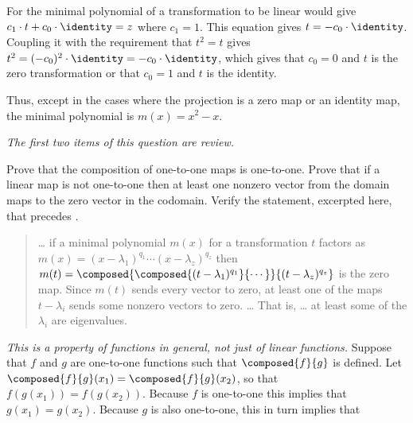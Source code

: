 \begin{exercises}
\begin{answer}
      For the minimal polynomial of a transformation to be linear would give 
      $c_1\cdot t+c_0\cdot\identity=z$ where $c_1=1$.
      This equation gives $t=-c_0\cdot \identity$.
      Coupling it with the requirement that $t^2=t$ gives
      $t^2=(-c_0)^2\cdot\identity=-c_0\cdot\identity$, which gives that
      $c_0=0$ and $t$ is the zero transformation or that $c_0=1$ and
      $t$ is the identity.       

      Thus, except in the cases where the projection is a zero map or an
      identity map, the minimal polynomial is $m(x)=x^2-x$. 
    \end{answer}
  \item \label{exer:SomeRootsMinPolyAreEigs}
    \textit{The first two items of this question are review.}
    \begin{exparts}
      \partsitem Prove that the composition of one-to-one maps is
        one-to-one.
      \partsitem Prove that if a linear map is not one-to-one then
        at least one nonzero vector from the domain maps to the 
        zero vector in the codomain.
      \partsitem Verify the statement, excerpted here, that
         precedes .
         \begin{quotation}
           \noindent \ldots{} 
           if a minimal polynomial $m(x)$ for a transformation $t$ 
           factors as
           $m(x)=(x-\lambda_1)^{q_1}\cdots (x-\lambda_z)^{q_z}$
           then 
           \( m(t)=\composed{\composed{(t-\lambda_1)^{q_1}}{\cdots}}{
                                                        (t-\lambda_z)^{q_z}} \) 
          is the zero map. 
          Since \( m(t) \) sends every vector to zero, at least
          one of the maps \( t-\lambda_i \)  sends some
          nonzero vectors to zero.  \ldots{}
          That is, \ldots{} 
          at least some of the \( \lambda_i \) are eigenvalues.
        \end{quotation}
    \end{exparts}
    \begin{answer}
      \begin{exparts}
       \partsitem \textit{This is a property of functions in general,
          not just of linear functions.}
          Suppose that $f$ and $g$ are one-to-one functions such that
          $\composed{f}{g}$ is defined.
          Let $\composed{f}{g}(x_1)=\composed{f}{g}(x_2)$, so that
          $f(g(x_1))=f(g(x_2))$.
          Because $f$ is one-to-one this implies that $g(x_1)=g(x_2)$.
          Because $g$ is also one-to-one, this in turn implies that

\end{exparts}
\end{answer}
\end{exercises}
